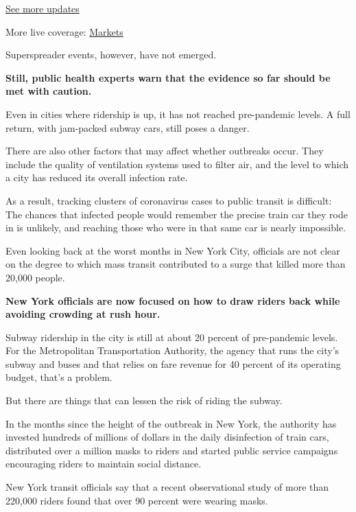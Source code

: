 \href{https://www.nytimes3xbfgragh.onion/2020/08/03/world/coronavirus-covid-19.html?action=click\&pgtype=Article\&state=default\&region=MAIN_CONTENT_1\&context=storylines_live_updates}{See
more updates}

More live coverage:
\href{https://www.nytimes3xbfgragh.onion/live/2020/08/03/business/stock-market-today-coronavirus?action=click\&pgtype=Article\&state=default\&region=MAIN_CONTENT_1\&context=storylines_live_updates}{Markets}

Superspreader events, however, have not emerged.

\textbf{Still, public health experts warn that the evidence so far
should be met with caution.}

Even in cities where ridership is up, it has not reached pre-pandemic
levels. A full return, with jam-packed subway cars, still poses a
danger.

There are also other factors that may affect whether outbreaks occur.
They include the quality of ventilation systems used to filter air, and
the level to which a city has reduced its overall infection rate.

As a result, tracking clusters of coronavirus cases to public transit is
difficult: The chances that infected people would remember the precise
train car they rode in is unlikely, and reaching those who were in that
same car is nearly impossible.

Even looking back at the worst months in New York City, officials are
not clear on the degree to which mass transit contributed to a surge
that killed more than 20,000 people.

\textbf{New York officials are now focused on how to draw riders back
while avoiding crowding at rush hour.}

Subway ridership in the city is still at about 20 percent of
pre-pandemic levels. For the Metropolitan Transportation Authority, the
agency that runs the city's subway and buses and that relies on fare
revenue for 40 percent of its operating budget, that's a problem.

But there are things that can lessen the risk of riding the subway.

In the months since the height of the outbreak in New York, the
authority has invested hundreds of millions of dollars in the daily
disinfection of train cars, distributed over a million masks to riders
and started public service campaigns encouraging riders to maintain
social distance.

New York transit officials say that a recent observational study of more
than 220,000 riders found that over 90 percent were wearing masks.

